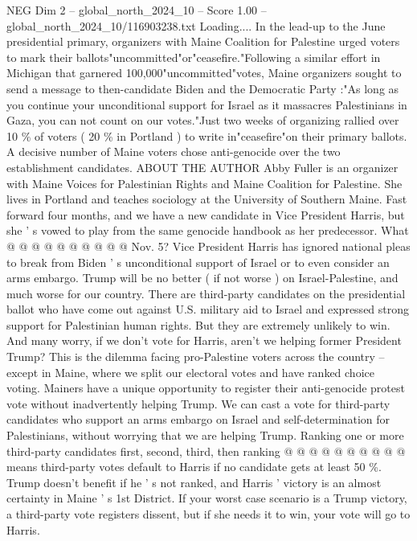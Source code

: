\begin{textsample}{NEG Dim 2 – global\_north\_2024\_10 – Score 1.00 – global\_north\_2024\_10/116903238.txt}  \label{ex:f2_neg_366}
Loading....
In the lead-up to the June presidential primary, organizers with Maine Coalition for Palestine urged voters to mark their ballots"uncommitted"or"ceasefire."Following a similar effort in Michigan that garnered 100,000"uncommitted"votes, Maine organizers sought to send a message to then-candidate Biden and the Democratic Party :"As long as you continue your unconditional support for Israel as it massacres Palestinians in Gaza, you can not count on our votes."Just two weeks of organizing rallied over 10 \% of voters ( 20 \% in Portland ) to write in"ceasefire"on their primary ballots.
A decisive number of Maine voters chose anti-genocide over the two establishment candidates.
ABOUT THE AUTHOR Abby Fuller is an organizer with Maine Voices for Palestinian Rights and Maine Coalition for Palestine.
She lives in Portland and teaches sociology at the University of Southern Maine.
Fast forward four months, and we have a new candidate in Vice President Harris, but she ' s vowed to play from the same genocide handbook as her predecessor.
What @ @ @ @ @ @ @ @ @ @ Nov. 5?
Vice President Harris has ignored national pleas to break from Biden ' s unconditional support of Israel or to even consider an arms embargo.
Trump will be no better ( if not worse ) on Israel-Palestine, and much worse for our country.
There are third-party candidates on the presidential ballot who have come out against U.S. military aid to Israel and expressed strong support for Palestinian human rights.
But they are extremely unlikely to win.
And many worry, if we don't vote for Harris, aren't we helping former President Trump?
This is the dilemma facing pro-Palestine voters across the country -- except in Maine, where we split our electoral votes and have ranked choice voting.
Mainers have a unique opportunity to register their anti-genocide protest vote without inadvertently helping Trump.
We can cast a vote for third-party candidates who support an arms embargo on Israel and self-determination for Palestinians, without worrying that we are helping Trump.
Ranking one or more third-party candidates first, second, third, then ranking @ @ @ @ @ @ @ @ @ @ means third-party votes default to Harris if no candidate gets at least 50 \%.
Trump doesn't benefit if he ' s not ranked, and Harris ' victory is an almost certainty in Maine ' s 1st District.
If your worst case scenario is a Trump victory, a third-party vote registers dissent, but if she needs it to win, your vote will go to Harris.

\end{textsample}
